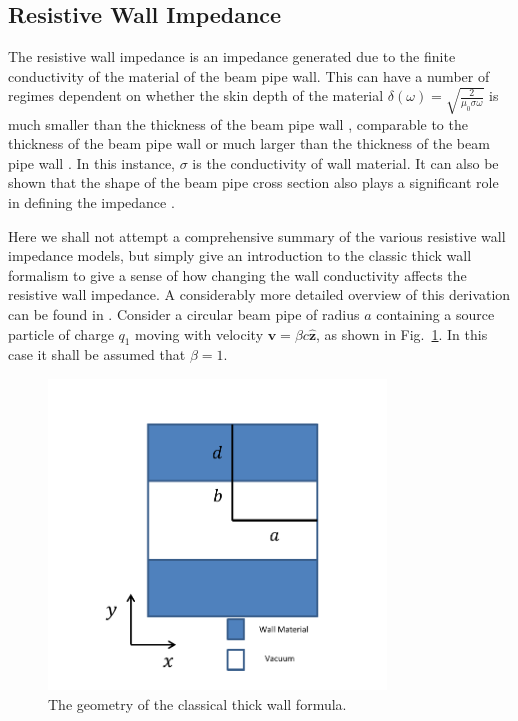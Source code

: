 \subsection{Resistive Wall Impedance}
\label{sec:res_wall_imp}

The resistive wall impedance is an impedance generated due to the finite conductivity of the material of the beam pipe wall. This can have a number of regimes dependent on whether the skin depth of the material $\delta \left( \omega \right) = \sqrt{\frac{2}{\mu_{0} \sigma \omega}}$ is much smaller than the thickness of the beam pipe wall \cite{Chao:PhysColEff}, comparable to the thickness of the beam pipe wall \cite{Roncarolo:ColImpMeas, Metral:ResWallWideFreq} or much larger than the thickness of the beam pipe wall \cite{Tsutsui:ferrKickLong, Biancacci:MMFiniteInsert}. In this instance, $\sigma$ is the conductivity of wall material. It can also be shown that the shape of the beam pipe cross section also plays a significant role in defining the impedance \cite{Mounet:Axisymmetric, Mounet:Flat}.

Here we shall not attempt a comprehensive summary of the various resistive wall impedance models, but simply give an introduction to the classic thick wall formalism to give a sense of how changing the wall conductivity affects the resistive wall impedance. A considerably more detailed overview of this derivation can be found in \cite{Chao:PhysColEff}. Consider a circular beam pipe of radius $a$ containing a source particle of charge $q_{1}$ moving with velocity $\mathbf{v} = \beta c \mathbf{\hat{z}}$, as shown in Fig.~\ref{fig:res_wall_diagram}. In this case it shall be assumed that $\beta = 1$.

\begin{figure}
\begin{center}
\includegraphics[width=0.8\textwidth]{Wakefields_and_Impedances/figures/reWallGeo.pdf}
\end{center}
\caption{The geometry of the classical thick wall formula.}
\label{fig:res_wall_diagram}
\end{figure}

